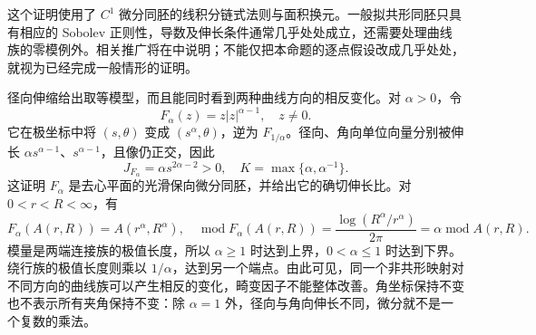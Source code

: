 \ProseParagraphBreak
这个证明使用了 \(C^1\) 微分同胚的线积分链式法则与面积换元。一般拟共形同胚只具有相应的 Sobolev 正则性，导数及伸长条件通常几乎处处成立，还需要处理曲线族的零模例外。相关推广将在中说明；不能仅把本命题的逐点假设改成几乎处处，就视为已经完成一般情形的证明。

\ProseParagraphBreak
径向伸缩给出取等模型，而且能同时看到两种曲线方向的相反变化。对 \(\alpha>0\)，令
\[
 F_\alpha(z)=z|z|^{\alpha-1},\quad z\ne0.
\]
它在极坐标中将 \((s,\theta)\) 变成 \((s^\alpha,\theta)\)，逆为 \(F_{1/\alpha}\)。径向、角向单位向量分别被伸长 \(\alpha s^{\alpha-1}\)、\(s^{\alpha-1}\)，且像仍正交，因此
\[
 J_{F_\alpha}=\alpha s^{2\alpha-2}>0,\quad
 K=\max\{\alpha,\alpha^{-1}\}.
\]
这证明 \(F_\alpha\) 是去心平面的光滑保向微分同胚，并给出它的确切伸长比。对 \(0<r<R<\infty\)，有
\[
 F_\alpha(A(r,R))=A(r^\alpha,R^\alpha),\quad
 \operatorname{mod}F_\alpha(A(r,R))
 =\frac{\log(R^\alpha/r^\alpha)}{2\pi}
 =\alpha\operatorname{mod}A(r,R).
\]
模量是两端连接族的极值长度，所以 \(\alpha\ge1\) 时达到上界，\(0<\alpha\le1\) 时达到下界。绕行族的极值长度则乘以 \(1/\alpha\)，达到另一个端点。由此可见，同一个非共形映射对不同方向的曲线族可以产生相反的变化，畸变因子不能整体改善。角坐标保持不变也不表示所有夹角保持不变：除 \(\alpha=1\) 外，径向与角向伸长不同，微分就不是一个复数的乘法。
